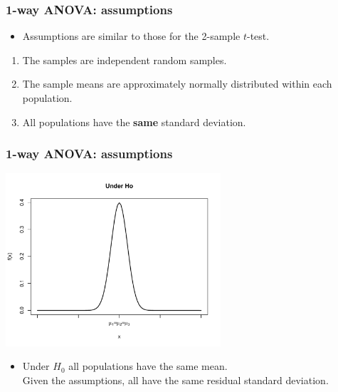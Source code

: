 \documentclass[12pt,xcolor=dvipsnames,handout,mathserif,aspectratio=169]{beamer}
\newcommand{\bre}[1]{{\color{red} \textbf{#1}}}
\begin{document}
\begin{frame}\frametitle{1-way ANOVA: assumptions}
\begin{itemize}
\item Assumptions are similar to those for the 2-sample $t$-test.
\end{itemize}
\begin{enumerate}
\item The samples are independent random samples.
\vspace*{0.3cm}
\item The sample means are approximately normally distributed within each population.
\vspace*{0.3cm}
\item All populations have the \bre{same} standard deviation.
\end{enumerate}
\vspace*{0.3cm}
\end{frame}


\begin{frame}\frametitle{1-way ANOVA: assumptions}
\vspace{-0.5cm}
\begin{center}
\includegraphics[width= 8cm]{UnderHoAgain.pdf}
\end{center}
\vspace{-0.5cm}
\begin{itemize}
\item Under $H_0$ all populations have the same mean.\\
Given the assumptions, all have the same residual standard deviation.
\end{itemize}
\end{frame}
\end{document}
